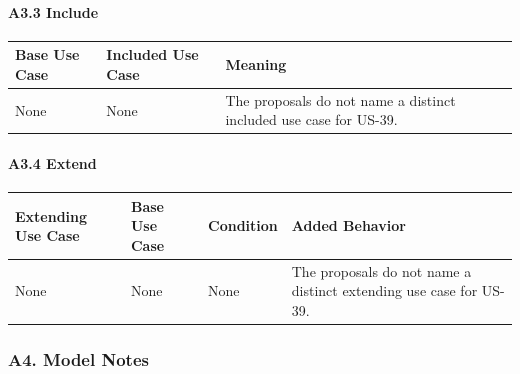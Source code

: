 \documentclass[12pt]{article}
\renewcommand{\baselinestretch}{1.5}
\begin{document}
\hypertarget{sec:a3-3-include}{}
\paragraph*{A3.3 Include}
\par\medskip

\begingroup
\small
\renewcommand{\baselinestretch}{1.0}\selectfont
\renewcommand{\arraystretch}{1.15}
\setlength{\tabcolsep}{6pt}
\begin{longtable}{|>{\raggedright\arraybackslash}p{}|>{\raggedright\arraybackslash}p{}|>{\raggedright\arraybackslash}p{}|}
\hline
\textbf{Base Use Case} & \textbf{Included Use Case} & \textbf{Meaning} \\ \hline
\endhead
None & None & The proposals do not name a distinct included use case for US-39. \\ \hline
\end{longtable}
\endgroup
\par\medskip

\hypertarget{sec:a3-4-extend}{}
\paragraph*{A3.4 Extend}
\par\medskip

\begingroup
\small
\renewcommand{\baselinestretch}{1.0}\selectfont
\renewcommand{\arraystretch}{1.15}
\setlength{\tabcolsep}{6pt}
\begin{longtable}{|>{\raggedright\arraybackslash}p{}|>{\raggedright\arraybackslash}p{}|>{\raggedright\arraybackslash}p{}|>{\raggedright\arraybackslash}p{}|}
\hline
\textbf{Extending Use Case} & \textbf{Base Use Case} & \textbf{Condition} & \textbf{Added Behavior} \\ \hline
\endhead
None & None & None & The proposals do not name a distinct extending use case for US-39. \\ \hline
\end{longtable}
\endgroup
\par\medskip

\hypertarget{sec:a4-model-notes}{}
\subsubsection*{A4. Model Notes}
\par\medskip
\end{document}
